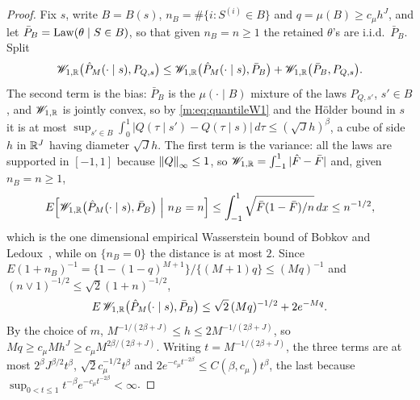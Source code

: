 \begin{proof}
Fix $s$, write $B=B(s)$, $n_B=\#\{i:S^{(i)}\in B\}$ and $q=\mu(B)\ge c_\mu h^J$, and let $\bar P_B=\operatorname{Law}(\theta\mid S\in B)$, so that given $n_B=n\ge1$ the retained $\theta$'s are i.i.d.\ $\bar P_B$. Split
\[
\mathscr{W}_{1,\mathbb{R}}\big(\hat P_M(\cdot\mid s),P_{Q,s}\big)\le\mathscr{W}_{1,\mathbb{R}}\big(\hat P_M(\cdot\mid s),\bar P_B\big)+\mathscr{W}_{1,\mathbb{R}}\big(\bar P_B,P_{Q,s}\big).
\]
The second term is the bias: $\bar P_B$ is the $\mu(\cdot\mid B)$ mixture of the laws $P_{Q,s'}$, $s'\in B$, and $\mathscr{W}_{1,\mathbb{R}}$ is jointly convex, so by \eqref{m:eq:quantileW1} and the H\"older bound in $s$ it is at most $\sup_{s'\in B}\int_0^1|Q(\tau\mid s')-Q(\tau\mid s)|\,d\tau\le(\sqrt Jh)^\beta$, a cube of side $h$ in $\mathbb{R}^J$ having diameter $\sqrt Jh$. The first term is the variance: all the laws are supported in $[-1,1]$ because $\left\|Q\right\|_\infty\le1$, so $\mathscr{W}_{1,\mathbb{R}}=\int_{-1}^1|\hat F-\bar F|$ and, given $n_B=n\ge1$,
\[
E\Big[\mathscr{W}_{1,\mathbb{R}}\big(\hat P_M(\cdot\mid s),\bar P_B\big)\ \Big|\ n_B=n\Big]\le\int_{-1}^1\sqrt{\bar F(1-\bar F)/n}\,dx\le n^{-1/2} ,
\]
which is the one dimensional empirical Wasserstein bound of Bobkov and Ledoux~\cite{bobkovledoux2019}, while on $\{n_B=0\}$ the distance is at most $2$. Since $E(1+n_B)^{-1}=\{1-(1-q)^{M+1}\}/\{(M+1)q\}\le(Mq)^{-1}$ and $(n\vee1)^{-1/2}\le\sqrt2(1+n)^{-1/2}$,
\[
E\,\mathscr{W}_{1,\mathbb{R}}\big(\hat P_M(\cdot\mid s),\bar P_B\big)\le\sqrt2\,(Mq)^{-1/2}+2e^{-Mq} .
\]
By the choice of $m$, $M^{-1/(2\beta+J)}\le h\le2M^{-1/(2\beta+J)}$, so $Mq\ge c_\mu Mh^J\ge c_\mu M^{2\beta/(2\beta+J)}$. Writing $t=M^{-1/(2\beta+J)}$, the three terms are at most $2^\beta J^{\beta/2}t^\beta$, $\sqrt2c_\mu^{-1/2}t^\beta$ and $2e^{-c_\mu t^{-2\beta}}\le C(\beta,c_\mu)t^\beta$, the last because $\sup_{0<t\le1}t^{-\beta}e^{-c_\mu t^{-2\beta}}<\infty$.
\end{proof}

